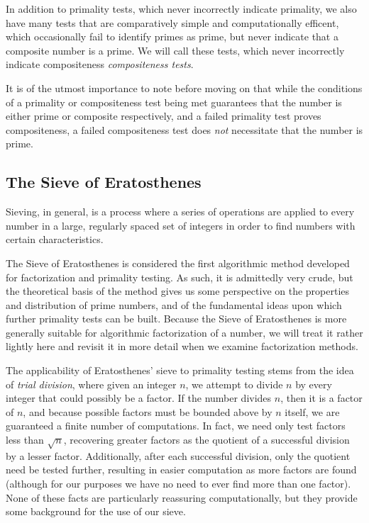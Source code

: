 \documentclass{article}
\begin{document}
\par In addition to primality tests, which never incorrectly indicate primality, we also have many tests that are comparatively simple and computationally efficent, which occasionally fail to identify primes as prime, but never indicate that a composite number is a prime. We will call these tests, which never incorrectly indicate compositeness \textit{compositeness tests}.

\par It is of the utmost importance to note before moving on that while the conditions of a primality or compositeness test being met guarantees that the number is either prime or composite respectively, and a failed primality test proves compositeness, a failed compositeness test does \textit{not} necessitate that the number is prime.

\subsection*{ The Sieve of Eratosthenes }

\par Sieving, in general, is a process where a series of operations are applied to every number in a large, regularly spaced set of integers in order to find numbers with certain characteristics.

\par The Sieve of Eratosthenes is considered the first algorithmic method developed for factorization and primality testing. As such, it is admittedly very crude, but the theoretical basis of the method gives us some perspective on the properties and distribution of prime numbers, and of the fundamental ideas upon which further primality tests can be built. Because the Sieve of Eratosthenes is more generally suitable for algorithmic factorization of a number, we will treat it rather lightly here and revisit it in more detail when we examine factorization methods.

\par The applicability of Eratosthenes' sieve to primality testing stems from the idea of \textit{trial division}, where given an integer $n$, we attempt to divide $n$ by every integer that could possibly be a factor. If the number divides $n$, then it is a factor of $n$, and because possible factors must be bounded above by $n$ itself, we are guaranteed a finite number of computations. In fact, we need only test factors less than $\sqrt{n}$, recovering greater factors as the quotient of a successful division by a lesser factor. Additionally, after each successful division, only the quotient need be tested further, resulting in easier computation as more factors are found (although for our purposes we have no need to ever find more than one factor). None of these facts are particularly reassuring computationally, but they provide some background for the use of our sieve.
\end{document}
